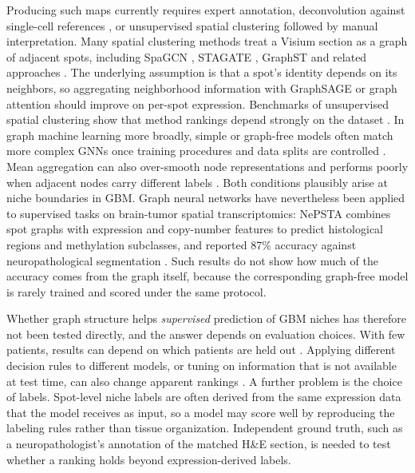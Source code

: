 \documentclass[11pt,letterpaper]{article}
\begin{document}
Producing such maps currently requires expert annotation, deconvolution against single-cell references \cite{kleshchevnikov2022,cable2022,li2022bench}, or unsupervised spatial clustering followed by manual interpretation. Many spatial clustering methods treat a Visium section as a graph of adjacent spots, including SpaGCN \cite{hu2021spagcn}, STAGATE \cite{dong2022stagate}, GraphST \cite{long2023graphst} and related approaches \cite{zhao2021bayesspace,xu2023spacel,peng2023,liu2023review,palla2022}. The underlying assumption is that a spot's identity depends on its neighbors, so aggregating neighborhood information with GraphSAGE \cite{hamilton2017} or graph attention \cite{velickovic2018} should improve on per-spot expression. Benchmarks of unsupervised spatial clustering show that method rankings depend strongly on the dataset \cite{yuan2024bench}. In graph machine learning more broadly, simple or graph-free models often match more complex GNNs once training procedures and data splits are controlled \cite{shchur2018,errica2020}. Mean aggregation can also over-smooth node representations \cite{li2018deeper} and performs poorly when adjacent nodes carry different labels \cite{zhu2020homophily}. Both conditions plausibly arise at niche boundaries in GBM. Graph neural networks have nevertheless been applied to supervised tasks on brain-tumor spatial transcriptomics: NePSTA combines spot graphs with expression and copy-number features to predict histological regions and methylation subclasses, and reported 87\% accuracy against neuropathological segmentation \cite{ritter2025}. Such results do not show how much of the accuracy comes from the graph itself, because the corresponding graph-free model is rarely trained and scored under the same protocol.

Whether graph structure helps \emph{supervised} prediction of GBM niches has therefore not been tested directly, and the answer depends on evaluation choices. With few patients, results can depend on which patients are held out \cite{bouthillier2021,varoquaux2022}. Applying different decision rules to different models, or tuning on information that is not available at test time, can also change apparent rankings \cite{kapoor2023}. A further problem is the choice of labels. Spot-level niche labels are often derived from the same expression data that the model receives as input, so a model may score well by reproducing the labeling rules rather than tissue organization. Independent ground truth, such as a neuropathologist's annotation of the matched H\&E section, is needed to test whether a ranking holds beyond expression-derived labels.
\end{document}
